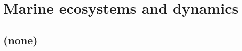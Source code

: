 
\cleardoublepage


\chapter{Marine ecosystems and dynamics}\label{ch:marine-ecosystems}

\hfill \break

\newpage

\section{(none)}

